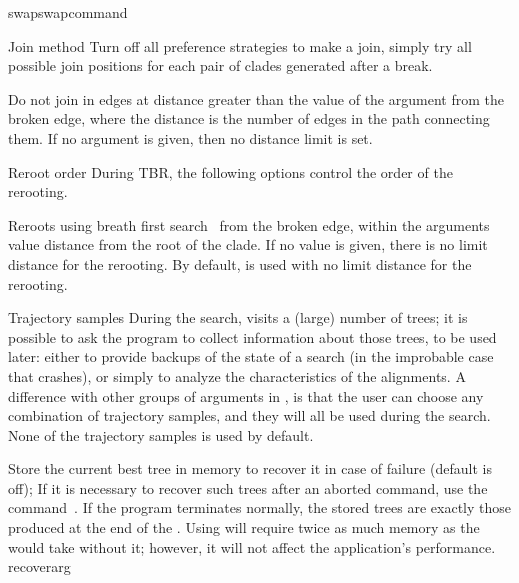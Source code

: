 \begin{command}{swap}{swapcommand}
\begin{arguments}
\begin{argumentgroup}{Join method}
                {Turn off all preference strategies to make a join, simply try
                all possible join positions for each pair of clades generated
                after a break.}
                {}

                {Do not join in edges at distance greater than the value of the argument
                from the broken edge, where the distance is the number of edges
                in the path connecting them. If no argument is given, then no
                distance limit is set.}
                {}
		
    \end{argumentgroup}

    \begin{argumentgroup}{Reroot order}
        {During TBR, the following options control the order of the rerooting.}

            {Reroots using breath first search~\cite{cormen2001} from the broken edge, within the
            arguments value distance from the root of the clade. If no value is
            given, there is no limit distance for the rerooting. By default, 
            is used with no limit distance for the rerooting.}
            {}

    \end{argumentgroup}

	\begin{argumentgroup}{Trajectory samples}
	{During the search, \poy visits a (large) number of trees; it is
        possible to ask the program to collect information about those
        trees, to be used later: either to provide backups of the state of a
        search (in the improbable case that \poy crashes), or simply to
        analyze the characteristics of the alignments. A difference with
        other groups of arguments in , is that the user can
        choose any combination of trajectory samples, and they will all be 
        used during the search. None of the trajectory samples is used by
        default.}

	{Store the current best tree in memory to recover it in
            case of failure (default is off); If it is necessary to recover such
            trees after an aborted command, use the command~. 
            If the program terminates normally, the stored trees are exactly
            those produced at the end of the . Using
             will require twice as much memory as the
             would take without it; however, it will not
            affect the application's performance.}
            {recoverarg}


\end{argumentgroup}
\end{arguments}
\end{command}
